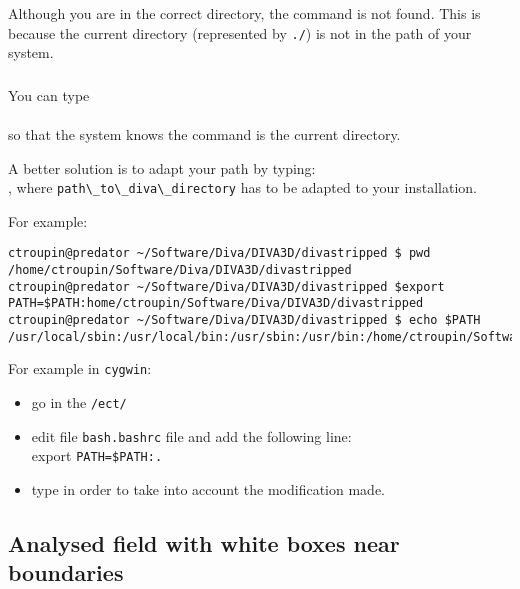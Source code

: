 Although you are in the correct directory, the command is not found. This is because the current directory (represented by \texttt{./}) is not in the path of your system. 

\subsubsection{\answer}

You can type \\
\\
so that the system knows the command is the current directory.

A better solution is to adapt your path by typing:\\
, where \verb|path\_to\_diva\_directory| has to be adapted to your installation.

For example:
\begin{lstlisting}[style=Bash]
ctroupin@predator ~/Software/Diva/DIVA3D/divastripped $ pwd
/home/ctroupin/Software/Diva/DIVA3D/divastripped
ctroupin@predator ~/Software/Diva/DIVA3D/divastripped $export  PATH=$PATH:home/ctroupin/Software/Diva/DIVA3D/divastripped
ctroupin@predator ~/Software/Diva/DIVA3D/divastripped $ echo $PATH
/usr/local/sbin:/usr/local/bin:/usr/sbin:/usr/bin:/home/ctroupin/Software/Diva/DIVA3D/divastripped/
\end{lstlisting}

For example in \texttt{cygwin}:\\
\begin{itemize}
\item go in the \texttt{/ect/}
\item edit file \texttt{bash.bashrc} file
and add the following line:\\
export \texttt{PATH=\$PATH:.}
\item type  in order to take into account the modification made.
\end{itemize}



\subsection{Analysed field with white boxes near boundaries}

